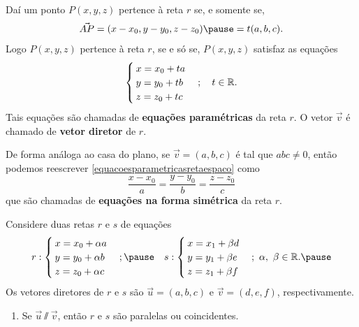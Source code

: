 \documentclass{beamer}
\begin{document}
\begin{frame}
    Daí um ponto $P(x, y, z)$ \pause pertence à reta $r$ \pause se, e somente se,\pause
    \[
        \vec{AP} = (x - x_0, y - y_0, z - z_0) \pause = t(a, b, c).
    \]\pause
    Logo $P(x, y, z)$ \pause pertence à reta $r$, \pause se e só se, \pause $P(x,y,z)$ satisfaz as equações\pause
    \begin{equation}\label{equacoesparametricasretaespaco}
        \begin{cases}
            x = x_0 + ta \\
            y = y_0 + tb \\
            z = z_0 + tc
        \end{cases}; \quad t \in \mathbb{R}.
    \end{equation}\pause
    Tais equações são chamadas de \textbf{equações paramétricas} da reta $r$. \pause O vetor $\vec{v}$ é chamado de \textbf{vetor diretor} de $r$.
\end{frame}

\begin{frame}
    De forma análoga ao casa do plano, \pause se $\vec{v} = (a,b,c)$ \pause é tal que $abc \ne 0$, \pause então podemos reescrever
    \eqref{equacoesparametricasretaespaco} como
    \[
        \dfrac{x - x_0}{a} = \dfrac{y - y_0}{b} = \dfrac{z - z_0}{c}
    \]\pause
    que são chamadas de \textbf{equações na forma simétrica} \pause da reta $r$.
\end{frame}

\begin{frame}
    Considere duas retas $r$ e $s$ \pause de equações\pause
    \[
        r: \begin{cases}
            x = x_0 + \alpha a \\
            y = y_0 + \alpha b \\
            z = z_0 + \alpha c
        \end{cases}; \pause \quad  s: \begin{cases}
            x = x_1 + \beta d \\
            y = y_1 + \beta e \\
            z = z_1 + \beta f
        \end{cases};\ \alpha,\ \beta \in \real.\pause
    \]
    Os vetores diretores de $r$ e $s$ são \pause $\vec{u} = (a,b,c)$ \pause e $\vec{v} = (d,e,f)$, \pause respectivamente.
\end{frame}

\begin{frame}
    \begin{enumerate}
        \item[i)] Se $\vec{u}\varparallel\vec{v}$, \pause então $r$ e $s$ são paralelas \pause ou coincidentes.
    \end{enumerate}
\end{frame}
\end{document}
